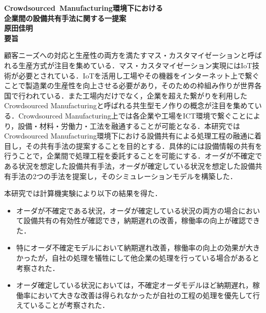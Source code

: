 \newpage
\thispagestyle{empty}
\begin{center}
	\mbox{\LARGE{\bf{Crowdsourced Manufacturing環境下における}}} \\
	\mbox{\LARGE{\bf{企業間の設備共有手法に関する一提案}}} \\
	\vspace*{2mm}
	\mbox{\Large{\bf{原田佳明}}}\\
	\vspace*{7mm}
	{\LARGE\bf 要旨}
\end{center}\par
顧客ニーズへの対応と生産性の両方を満たすマス・カスタマイゼーションと呼ばれる生産方式が注目を集めている．マス・カスタマイゼーション実現にはIoT技術が必要とされている．IoTを活用し工場やその機器をインターネット上で繋ぐことで製造業の生産性を向上させる必要があり，そのための枠組み作りが世界各国で行われている．また工場内だけでなく，企業を超えた繋がりを利用したCrowdsourced Manufacturingと呼ばれる共生型モノ作りの概念が注目を集めている．Crowdsourced Manufacturing上では各企業や工場をICT環境で繋ぐことにより，設備・材料・労働力・工法を融通することが可能となる．本研究ではCrowdsourced Manufacturing環境下における設備共有による処理工程の融通に着目し，その共有手法の提案することを目的とする．具体的には設備情報の共有を行うことで，企業間で処理工程を委託することを可能にする．オーダが不確定である状況を想定した設備共有手法，オーダが確定している状況を想定した設備共有手法の2つの手法を提案し，そのシミュレーションモデルを構築した．\par
本研究では計算機実験により以下の結果を得た．
\begin{itemize}
	\item オーダが不確定である状況，オーダが確定している状況の両方の場合において設備共有の有効性が確認でき，納期遅れの改善，稼働率の向上が確認できた．
	\item 特にオーダ不確定モデルにおいて納期遅れ改善，稼働率の向上の効果が大きかったが，自社の処理を犠牲にして他企業の処理を行っている場合があると考察された．
	\item オーダ確定している状況においては，不確定オーダモデルほど納期遅れ，稼働率において大きな改善は得られなかったが自社の工程の処理を優先して行えていることが考察された．
\end{itemize}